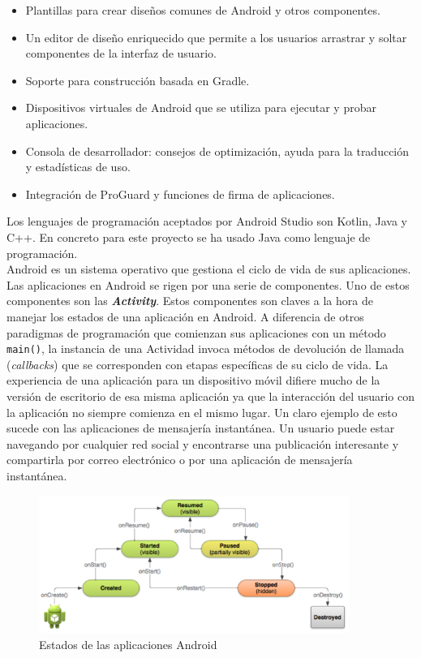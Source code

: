 \begin {itemize}
\item Plantillas para crear dise\~nos comunes de Android y otros componentes.
\item Un editor de dise\~no enriquecido que permite a los usuarios arrastrar y soltar componentes de la interfaz de usuario.
\item Soporte para construcci\'on basada en Gradle.
\item Dispositivos virtuales de Android que se utiliza para ejecutar y probar aplicaciones.
\item Consola de desarrollador: consejos de optimizaci\'on, ayuda para la traducci\'on y estad\'isticas de uso.
\item Integraci\'on de ProGuard y funciones de firma de aplicaciones.
\end {itemize}



Los lenguajes de programaci\'on aceptados por Android Studio son Kotlin, Java y C++. En concreto para este proyecto se ha usado Java como lenguaje de programaci\'on.\\

Android es un sistema operativo que gestiona el ciclo de vida de sus aplicaciones. Las aplicaciones en Android se rigen por una serie de componentes. Uno de estos componentes son las \textbf{\textit{Activity}}. Estos componentes son claves a la hora de manejar los estados de una aplicaci\'on en Android. A diferencia de otros paradigmas de programaci\'on que comienzan sus aplicaciones con un m\'etodo \texttt{main()}, la instancia de una Actividad invoca m\'etodos de devoluci\'on de llamada (\emph{callbacks}) que se corresponden con etapas espec\'ificas de su ciclo de vida. La experiencia de una aplicaci\'on para un dispositivo m\'ovil difiere mucho de la versi\'on de escritorio de esa misma aplicaci\'on ya que la interacci\'on del usuario con la aplicaci\'on no siempre comienza en el mismo lugar. Un claro ejemplo de esto sucede con las aplicaciones de mensajer\'ia instant\'anea. Un usuario puede estar navegando por cualquier red social y encontrarse una publicaci\'on interesante y compartirla por correo electr\'onico o por una aplicaci\'on de mensajer\'ia instant\'anea.\\

 \begin{figure}[!h]
    \centering
    \includegraphics[width=0.90\textwidth]{./Imagenes/Vectorial/lifecycle-states.pdf}
    \caption{Estados de las aplicaciones Android}
\label{Fig:estados}
\end{figure}

